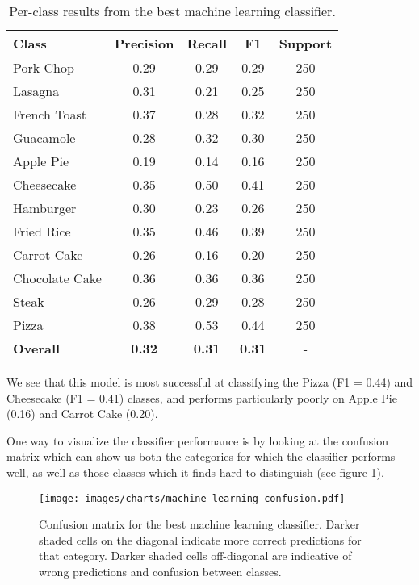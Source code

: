 \documentclass[10pt,a4paper]{article}
\begin{document}
\begin{table}[h]
\small
\setlength\extrarowheight{2pt}
\caption{Per-class results from the best machine learning classifier.}
\begin{tabular}{p{4cm} c c c c}
\hline
\textbf{Class} & \textbf{Precision} & \textbf{Recall} & \textbf{F1} & \textbf{Support} \\
\hline
Pork Chop & 0.29 & 0.29 & 0.29 & 250\\
Lasagna & 0.31 & 0.21 & 0.25 & 250\\
French Toast & 0.37 & 0.28 & 0.32 & 250\\
Guacamole & 0.28 & 0.32 & 0.30 & 250\\
Apple Pie & 0.19 & 0.14 & 0.16 & 250\\
Cheesecake & 0.35 & 0.50 & 0.41 & 250\\
Hamburger & 0.30 & 0.23 & 0.26 & 250\\
Fried Rice & 0.35 & 0.46 & 0.39 & 250\\
Carrot Cake & 0.26 & 0.16 & 0.20 & 250\\
Chocolate Cake & 0.36 & 0.36 & 0.36 & 250\\
Steak & 0.26 & 0.29 & 0.28 & 250\\
Pizza & 0.38 & 0.53 & 0.44 & 250\\
\hline
\hline
\textbf{Overall} & \textbf{0.32} & \textbf{0.31} & \textbf{0.31} & -\\
\hline
\hline
\end{tabular}
\label{table:mach-learn-results}
\end{table}

We see that this model is most successful at classifying the Pizza (F1 = 0.44) and Cheesecake (F1 = 0.41) classes, and performs particularly poorly on Apple Pie (0.16) and  Carrot Cake (0.20).

One way to visualize the classifier performance is by looking at the confusion matrix which can show us both the categories for which the classifier performs well, as well as those classes which it finds hard to distinguish (see figure \ref{fig:machine-learning-confusion}).

\begin{figure}[!h]
\begin{framed}
\hspace*{-2cm}
  \caption{Confusion matrix for the best machine learning classifier. Darker shaded cells on the diagonal indicate more correct predictions for that category. Darker shaded cells off-diagonal are indicative of wrong predictions and confusion between classes.}
  \texttt{[image: images/charts/machine\_learning\_confusion.pdf]}
  \label{fig:machine-learning-confusion}
\end{framed}
\end{figure}
\end{document}
